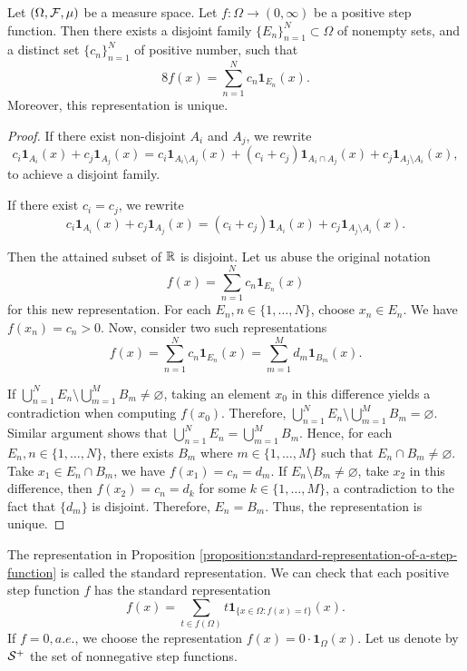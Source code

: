 \begin{proposition}
  \label{proposition:standard-representation-of-a-step-function}
  Let $(\Omega, \F, \mu)$ be a measure space. Let $f:\Omega\to(0,\infty)$ be a positive step function. Then there exists a disjoint family $\{E_n\}_{n=1}^N\subset\Omega$ of nonempty sets, and a distinct set $\{c_n\}_{n=1}^N$ of positive number, such that
  \begin{equation}8
    f(x)=\sum\limits_{n=1}^Nc_n\mathbf{1}_{E_n}(x).
  \end{equation}
  Moreover, this representation is unique.
\end{proposition}
\begin{proof}
  If there exist non-disjoint $A_i$ and $A_j$, we rewrite
  $$c_i\mathbf{1}_{A_i}(x) + c_j\mathbf{1}_{A_j}(x) = c_i\mathbf{1}_{A_i\setminus A_j}(x) + (c_i+c_j)\mathbf{1}_{A_i \cap A_j}(x) + c_j\mathbf{1}_{A_j\setminus A_i}(x),$$
  to achieve a disjoint family.

  If there exist $c_i = c_j$, we rewrite
  $$c_i\mathbf{1}_{A_i}(x) + c_j\mathbf{1}_{A_j}(x) = (c_i+c_j)\mathbf{1}_{A_i}(x) + c_j\mathbf{1}_{A_j\setminus A_i}(x).$$

  Then the attained subset of $\RR$ is disjoint. Let us abuse the original notation
  $$f(x)=\sum\limits_{n=1}^N c_n\mathbf{1}_{E_n}(x)$$
  for this new representation. For each $E_n, n\in\{1,\ldots,N\}$, choose $x_n\in E_n$. We have $f(x_n) = c_n > 0$. Now, consider two such representations
  $$f(x)=\sum\limits_{n=1}^Nc_n\mathbf{1}_{E_n}(x) = \sum\limits_{m=1}^Md_m\mathbf{1}_{B_m}(x).$$

  If $\bigcup_{n=1}^N E_n\setminus \bigcup_{m=1}^M B_m \ne \varnothing$, taking an element $x_0$ in this difference yields a contradiction when computing $f(x_0)$. Therefore, $\bigcup_{n=1}^N E_n\setminus \bigcup_{m=1}^M B_m = \varnothing$. Similar argument shows that $\bigcup_{n=1}^N E_n = \bigcup_{m=1}^M B_m$. Hence, for each $E_n, n\in\{1,\ldots, N\}$, there exists $B_m$ where $m\in\{1,\ldots,M\}$ such that $E_n\cap B_m\ne \varnothing$. Take $x_1\in E_n\cap B_m$, we have $f(x_1) = c_n = d_m$. If $E_n\setminus B_m \ne \varnothing$, take $x_2$ in this difference, then $f(x_2) = c_n = d_k$ for some $k\in\{1,\ldots,M\}$, a contradiction to the fact that $\{d_m\}$ is disjoint. Therefore, $E_n = B_m$. Thus, the representation is unique.
\end{proof}
\begin{remark}
  The representation in Proposition \ref{proposition:standard-representation-of-a-step-function} is called the standard representation. We can check that each positive step function $f$ has the standard representation
  \begin{equation}
    f(x) = \sum\limits_{t\in f(\Omega)} t\mathbf{1}_{\{x\in \Omega : f(x) = t\}}(x).
  \end{equation}
  If $f = 0, a.e.$, we choose the representation $f(x) = 0\cdot \mathbf{1}_{\Omega}(x)$. Let us denote by $\S^+$ the set of nonnegative step functions.
\end{remark}

